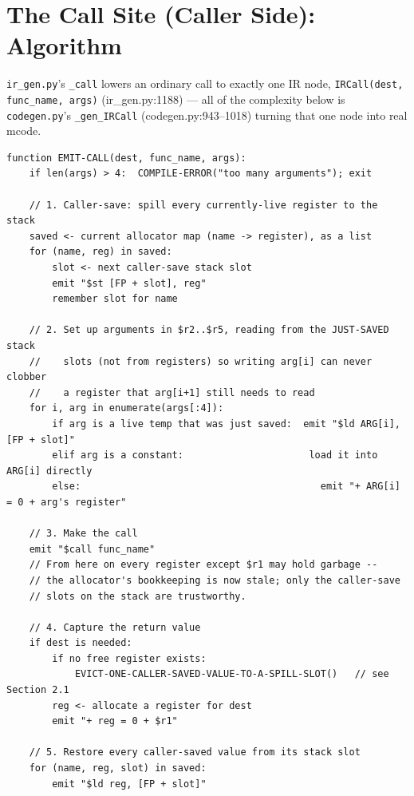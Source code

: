 \documentclass[11pt,a4paper]{article}
\begin{document}
\section{The Call Site (Caller Side): Algorithm}
\label{sec:caller}

\texttt{ir\_gen.py}'s \texttt{\_call} lowers an ordinary call to exactly one IR node,
\texttt{IRCall(dest, func\_name, args)} (ir\_gen.py:1188) --- all of the complexity below
is \texttt{codegen.py}'s \texttt{\_gen\_IRCall} (codegen.py:943--1018) turning that one
node into real mcode.

\begin{lstlisting}[style=pseudostyle, caption={\texttt{\_gen\_IRCall}, codegen.py:943--1018 (essence)}]
function EMIT-CALL(dest, func_name, args):
    if len(args) > 4:  COMPILE-ERROR("too many arguments"); exit

    // 1. Caller-save: spill every currently-live register to the stack
    saved <- current allocator map (name -> register), as a list
    for (name, reg) in saved:
        slot <- next caller-save stack slot
        emit "$st [FP + slot], reg"
        remember slot for name

    // 2. Set up arguments in $r2..$r5, reading from the JUST-SAVED stack
    //    slots (not from registers) so writing arg[i] can never clobber
    //    a register that arg[i+1] still needs to read
    for i, arg in enumerate(args[:4]):
        if arg is a live temp that was just saved:  emit "$ld ARG[i], [FP + slot]"
        elif arg is a constant:                      load it into ARG[i] directly
        else:                                          emit "+ ARG[i] = 0 + arg's register"

    // 3. Make the call
    emit "$call func_name"
    // From here on every register except $r1 may hold garbage --
    // the allocator's bookkeeping is now stale; only the caller-save
    // slots on the stack are trustworthy.

    // 4. Capture the return value
    if dest is needed:
        if no free register exists:
            EVICT-ONE-CALLER-SAVED-VALUE-TO-A-SPILL-SLOT()   // see Section 2.1
        reg <- allocate a register for dest
        emit "+ reg = 0 + $r1"

    // 5. Restore every caller-saved value from its stack slot
    for (name, reg, slot) in saved:
        emit "$ld reg, [FP + slot]"
\end{lstlisting}
\end{document}
